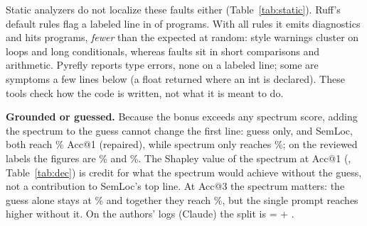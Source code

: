 Static analyzers do not localize these faults either (Table~\ref{tab:static}). Ruff's default rules flag a labeled line in
\StatReviewedRuffDefaultOnFaultLine{} of \StatReviewedRuffDefaultPrograms{} programs. With all rules it emits
\StatReviewedRuffAllDiagnostics{} diagnostics and hits \StatReviewedRuffAllOnFaultLine{} programs, \emph{fewer} than the
\StatReviewedRuffAllOnFaultLineByChance{} expected at random: style warnings cluster on loops and long conditionals,
whereas faults sit in short comparisons and arithmetic. Pyrefly reports \StatReviewedPyreflyDiagnostics{} type errors,
none on a labeled line; some are symptoms a few lines below (a float returned where an int is declared). These tools check
how the code is written, not what it is meant to do.

\begin{table}[!t]
\centering
\caption{Static analysis on the 250 programs (reviewed labels)}
\label{tab:static}
\resizebox{\columnwidth}{!}{}
\end{table}

\textbf{Grounded or guessed.} Because the bonus exceeds any spectrum score, adding the spectrum to the guess cannot change
the first line: guess only, and SemLoc, both reach \RqTwoRepairedAllSemlocAccOneMean\% Acc@1 (repaired), while spectrum only
reaches \RqTwoRepairedAllSemlocNoPriorAccOneMean\%; on the reviewed labels the figures are
\RqTwoReviewedAllSemlocAccOneMean\% and \RqTwoReviewedAllSemlocNoPriorAccOneMean\%. The Shapley value of the spectrum at
Acc@1 (\DecSemlocRepairedAllAccOnePhiSpectrum, Table~\ref{tab:dec}) is credit for what the spectrum would achieve without
the guess, not a contribution to SemLoc's top line. At Acc@3 the spectrum matters: the guess alone stays at
\RqTwoRepairedAllSemlocAccOneMean\% and together they reach \RqTwoRepairedAllSemlocAccThreeMean\%, but the single prompt reaches
higher without it. On the authors' logs (Claude) the split is \PubSemlocClaudeTZeroEightSemlocOriginalAllAccOneFull{} =
\PubSemlocClaudeTZeroEightSemlocOriginalAllAccOnePhiGuess{} + \PubSemlocClaudeTZeroEightSemlocOriginalAllAccOnePhiSpectrum.

\begin{table}[!t]
\centering
\caption{Shapley split of SemLoc's accuracy (our runs, three repeats; template-cluster CIs). Upper block: the game whose
total is SemLoc as released; lower block: all four signals (a different system).}
\label{tab:dec}
\resizebox{\columnwidth}{!}{}
\end{table}

